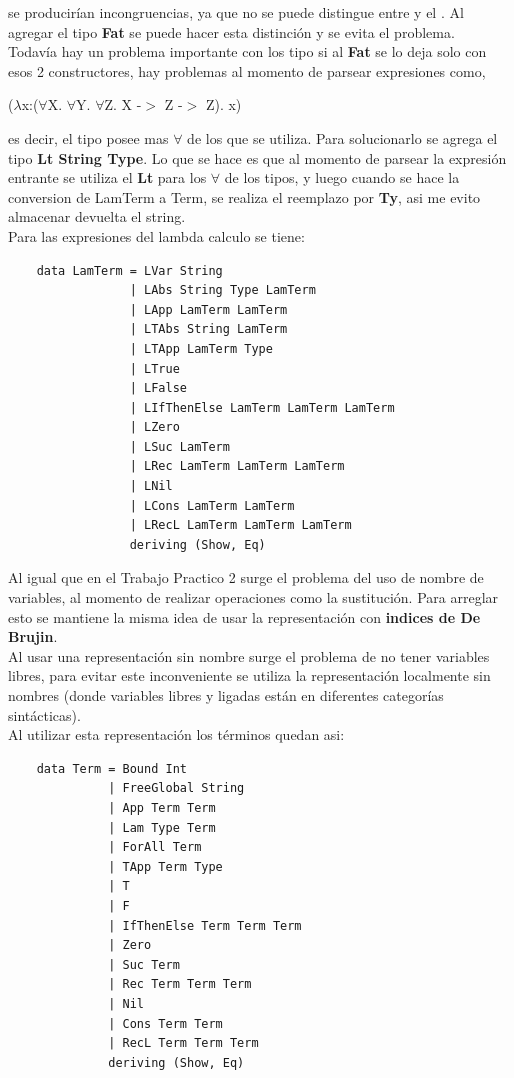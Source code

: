 \documentclass[12pt, titlepage, a4paper]{article}
\begin{document}
  se producirían incongruencias, ya que no se puede distingue entre \say{$\Lambda$} y el \say{$\forall$}. Al agregar el tipo \textbf{Fat} se puede 
  hacer esta distinción  y se evita el problema.\\

  Todavía hay un problema importante con los tipo si al \textbf{Fat} se lo deja solo con esos 2 constructores, hay problemas al momento de parsear 
  expresiones como,

  \begin{center}
    ($\lambda$x:($\forall$X. $\forall$Y. $\forall$Z. X -$>$ Z -$>$ Z). x)
  \end{center}  

  es decir, el tipo posee mas $\forall$ de los que se utiliza. Para solucionarlo se agrega el tipo \textbf{Lt String Type}. Lo que se hace es que 
  al momento de parsear la expresión entrante se utiliza el \textbf{Lt} para los $\forall$ de los tipos, y luego cuando se hace la conversion de 
  LamTerm a Term, se realiza el reemplazo por \textbf{Ty}, asi me evito almacenar devuelta el string.\\


\noindent Para las expresiones del lambda calculo se tiene:
\begin{verbatim}
    data LamTerm = LVar String
                 | LAbs String Type LamTerm
                 | LApp LamTerm LamTerm
                 | LTAbs String LamTerm
                 | LTApp LamTerm Type
                 | LTrue 
                 | LFalse
                 | LIfThenElse LamTerm LamTerm LamTerm
                 | LZero
                 | LSuc LamTerm
                 | LRec LamTerm LamTerm LamTerm
                 | LNil
                 | LCons LamTerm LamTerm
                 | LRecL LamTerm LamTerm LamTerm
                 deriving (Show, Eq)
\end{verbatim}

Al igual que en el Trabajo Practico 2 \cite{tp2:lambdaCalculoSimpleTipado} surge el problema del uso de nombre de variables, al 
momento de realizar operaciones como la sustitución. Para arreglar esto se mantiene la misma idea de 
usar la representación con \textbf{indices de De Brujin}. \\

Al usar una representación sin nombre surge el problema de no tener variables libres,  
para evitar este inconveniente se utiliza la representación localmente sin nombres (donde variables libres y ligadas están 
en diferentes categorías sintácticas). \\
\noindent Al utilizar esta representación los términos quedan asi:
\begin{verbatim}
    data Term = Bound Int
              | FreeGlobal String 
              | App Term Term
              | Lam Type Term
              | ForAll Term
              | TApp Term Type
              | T
              | F
              | IfThenElse Term Term Term
              | Zero
              | Suc Term
              | Rec Term Term Term
              | Nil
              | Cons Term Term
              | RecL Term Term Term
              deriving (Show, Eq)
\end{verbatim}
\end{document}
